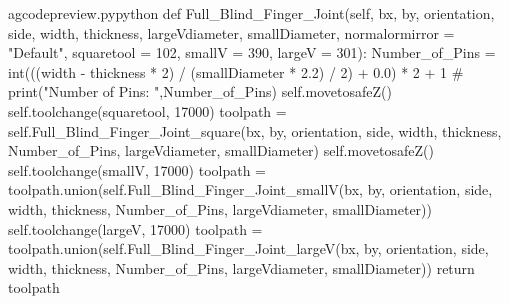 \documentclass{ltxdoc}
\begin{document}
\lstset{firstnumber=\thegcpy}
\begin{writecode}{a}{gcodepreview.py}{python}
    def Full_Blind_Finger_Joint(self, bx, by, orientation, side, width, thickness, largeVdiameter, smallDiameter, normalormirror = "Default", squaretool = 102, smallV = 390, largeV = 301):
        Number_of_Pins = int(((width - thickness * 2) / (smallDiameter * 2.2) / 2) + 0.0) * 2 + 1
#        print("Number of Pins: ",Number_of_Pins)
        self.movetosafeZ()
        self.toolchange(squaretool, 17000)
        toolpath = self.Full_Blind_Finger_Joint_square(bx, by, orientation, side, width, thickness, Number_of_Pins, largeVdiameter, smallDiameter)
        self.movetosafeZ()
        self.toolchange(smallV, 17000)
        toolpath = toolpath.union(self.Full_Blind_Finger_Joint_smallV(bx, by, orientation, side, width, thickness, Number_of_Pins, largeVdiameter, smallDiameter))
        self.toolchange(largeV, 17000)
        toolpath = toolpath.union(self.Full_Blind_Finger_Joint_largeV(bx, by, orientation, side, width, thickness, Number_of_Pins, largeVdiameter, smallDiameter))
        return toolpath


\end{writecode}
\end{document}
